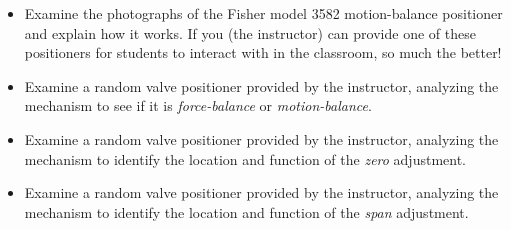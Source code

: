 \begin{itemize}
\item{} Examine the photographs of the Fisher model 3582 motion-balance positioner and explain how it works.  If you (the instructor) can provide one of these positioners for students to interact with in the classroom, so much the better!
\item{} Examine a random valve positioner provided by the instructor, analyzing the mechanism to see if it is {\it force-balance} or {\it motion-balance}.
\item{} Examine a random valve positioner provided by the instructor, analyzing the mechanism to identify the location and function of the {\it zero} adjustment.
\item{} Examine a random valve positioner provided by the instructor, analyzing the mechanism to identify the location and function of the {\it span} adjustment.
\end{itemize}





